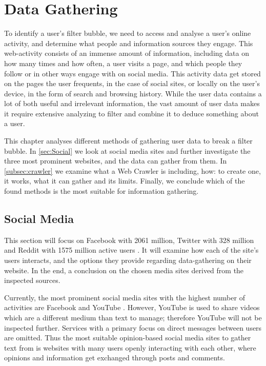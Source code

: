 \chapter{Data Gathering}\label{cha:DG}
To identify a user's filter bubble, we need to access and analyse a user's
online activity, and determine what people and information sources they engage. This
web-activity consists of an immense amount of information, including data on how
many times and how often, a user visits a page, and which people they follow or
in other ways engage with on social media. This activity data get stored on the
pages the user frequents, in the case of social sites, or locally on the user's
device, in the form of search and browsing history. While the user data contains
a lot of both useful and irrelevant information, the vast amount of user data
makes it require extensive analyzing to filter and combine it to deduce
something about a user.\nl

This chapter analyses different methods of gathering user data to break a filter
bubble. In \autoref{sec:Social} we look at social media sites and further
investigate the three most prominent websites, and the data can gather from
them. In \autoref{subsec:crawler} we examine what a Web Crawler is including,
how: to create one, it works, what it can gather and its limits. Finally, we
conclude which of the found methods is the most suitable for information
gathering.

\section{Social Media}\label{sec:Social}
This section will focus on Facebook with 2061 million, Twitter with 328 million
and Reddit with 1575 million active users \citep{SocialMediaStats,
AdvertiseOnReddit}. It will examine how each of the site's users interacts, and
the options they provide regarding data-gathering on their website. In the end,
a conclusion on the chosen media sites derived from the inspected sources.

Currently, the most prominent social media sites with the highest number of
activities are Facebook and YouTube \citep{SocialMediaStats}. However, YouTube
is used to share videos which are a different medium than text to manage;
therefore YouTube will not be inspected further. Services with a primary focus
on direct messages between users are omitted. Thus the most suitable
opinion-based social media sites to gather text from is websites with many users
openly interacting with each other, where opinions and information get exchanged
through posts and comments.\nl